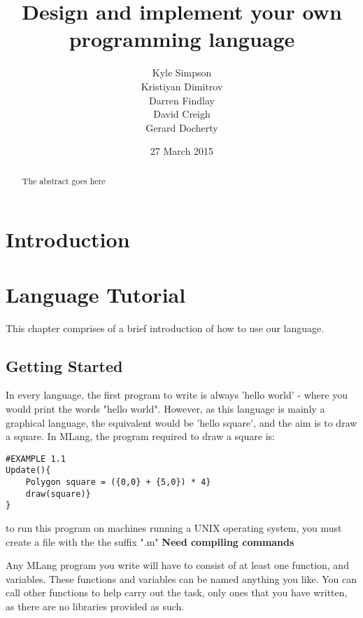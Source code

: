 \documentclass{l3proj}
\begin{document}
\title{Design and implement your own programming language}
\author{Kyle Simpson\\
		Kristiyan Dimitrov\\
        Darren Findlay\\
        David Creigh\\
		Gerard Docherty}
\date{27 March 2015}
\maketitle
\begin{abstract}

The abstract goes here

\end{abstract}
\educationalconsent
\tableofcontents
\chapter{Introduction}
\label{intro}


\chapter{Language Tutorial}
\label{tut}
This chapter comprises of a brief introduction of how to use our language.
\section{Getting Started}
\label{start}
In every language, the first program to write is always 'hello world' - where you would print the words "hello world". However, as this language is mainly a graphical language, the equivalent would be 'hello square', and the aim is to draw a square. In MLang, the program required to draw a square is:\\
\begin{lstlisting}
#EXAMPLE 1.1
Update(){
	Polygon square = ({0,0} + {5,0}) * 4}
	draw(square)}
}
\end{lstlisting}
to run this program on machines running a UNIX operating system, you must create a file with the the suffix ".m"
\textbf{Need compiling commands}

Any MLang program you write will have to consist of at least one function, and variables. These functions and variables can be named anything you like. You can call other functions to help carry out the task, only ones that you have written, as there are no libraries provided as such. 
\end{document}
